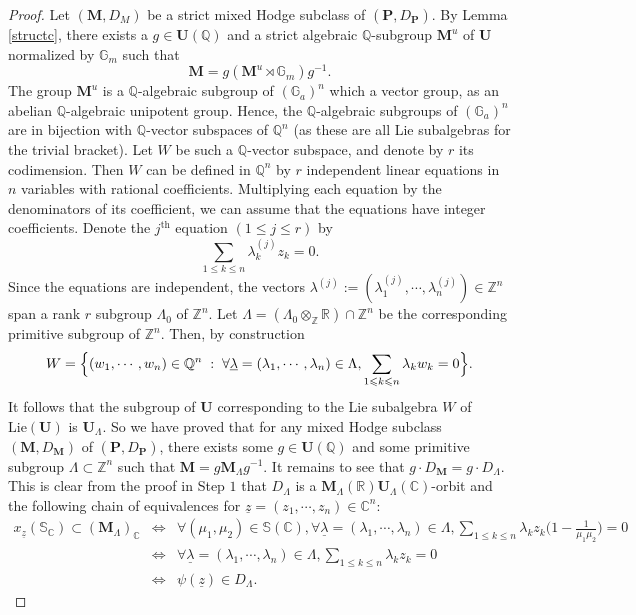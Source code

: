 \documentclass[10pt]{article}
\numberwithin{equation}{subsection}
\theoremstyle{plain}
\theoremstyle{definition}
\theoremstyle{remark}
\newcommand{\Z}{\mathbb Z}
\newcommand{\Q}{\mathbb Q}
\newcommand{\C}{\mathbb C}
\newcommand{\R}{\mathbb R}
\newcommand{\s}{\mathbb S}
\newcommand{\mult}{\mathbb G}
\newcommand{\pp}{\mathbf P}
\newcommand{\uu}{\mathbf U}
\newcommand{\M}{\mathbf M}
\newcommand{\zz}{\underline{z}}
\newcommand{\lambdaa}{\underline{\lambda}}
\begin{document}
\begin{proof}
Let $(\M, D_M)$ be a strict mixed Hodge subclass of $(\pp, D_\pp)$. By Lemma \ref{structc}, there exists a $g \in \uu(\Q)$ and a strict algebraic $\Q$-subgroup $\M^u$ of $\uu$ normalized by $\mult_m$ such that
\[
\M = g ( \M^u \rtimes \mult_m) g^{-1}.
\]
The group $\M^u$ is a $\Q$-algebraic subgroup of $(\mult_a)^n$ which a vector group, as an abelian $\Q$-algebraic unipotent group. Hence, the $\Q$-algebraic subgroups of $(\mult_a)^n$ are in bijection with $\Q$-vector subspaces of $\Q^n$ (as these are all Lie subalgebras for the trivial bracket). Let $W$ be such a $\Q$-vector subspace, and denote by $r$ its codimension. Then $W$ can be defined in $\Q^n$ by $r$ independent linear equations in $n$ variables with rational coefficients. Multiplying each equation by the denominators of its coefficient, we can assume that the equations have integer coefficients. Denote the $j^{\mathrm{th}}$ equation $(1 \leqslant j \leqslant r)$ by
\[
\sum_{1 \leqslant k \leqslant n} \lambda_k^{(j)} z_k = 0.
\]
Since the equations are independent, the vectors $\lambda^{(j)}  := (\lambda_1^{(j)}, \cdots, \lambda_n^{(j)}) \in \Z^n$ span a rank $r$ subgroup $\Lambda_0$ of $\Z^n$. Let $\Lambda = (\Lambda_0 \otimes_\Z \R) \cap \Z^n$ be the corresponding primitive subgroup of $\Z^n$. Then, by construction
\[
W = \Big\{ (w_1, \cdots, w_n) \in \Q^n \hspace{0.1cm} : \hspace{0.1cm} \forall \lambdaa = (\lambda_1, \cdots, \lambda_n) \in \Lambda, \sum_{1 \leqslant k \leqslant n} \lambda_k w_k = 0\Big\}.
\]
It follows that the subgroup of $\uu$ corresponding to the Lie subalgebra $W$ of $\mathrm{Lie}(\uu)$ is $\uu_\Lambda$. So we have proved that for any mixed Hodge subclass $(\M, D_\M)$ of $(\pp, D_\pp)$, there exists some $g \in \uu(\Q)$ and some primitive subgroup $\Lambda \subset \Z^n$ such that $\M = g \M_\Lambda g^{-1}$. It remains to see that $g \cdot D_\M = g \cdot D_\Lambda$. This is clear from the proof in Step $1$ that $D_\Lambda$ is a $\M_\Lambda(\R)\uu_\Lambda(\C)$-orbit and the following chain of equivalences for $\zz = (z_1, \cdots, z_n) \in \C^n$:
{\small\begin{eqnarray*}
x_{\zz}(\s_\C) \subset (\M_\Lambda)_\C & \Leftrightarrow & \forall (\mu_1, \mu_2) \in \s(\C), \forall \lambdaa =  (\lambda_1,\cdots, \lambda_n) \in \Lambda, \sum_{1 \leqslant k \leqslant n} \lambda_k z_k \big(1 - \frac{1}{\mu_1\mu_2}\big) = 0 \\
& \Leftrightarrow & \forall \lambdaa =  (\lambda_1,\cdots, \lambda_n) \in \Lambda, \sum_{1 \leqslant k \leqslant n} \lambda_k z_k = 0 \\
& \Leftrightarrow & \psi(\zz) \in D_\Lambda.
\end{eqnarray*}}
\end{proof}
\end{document}

